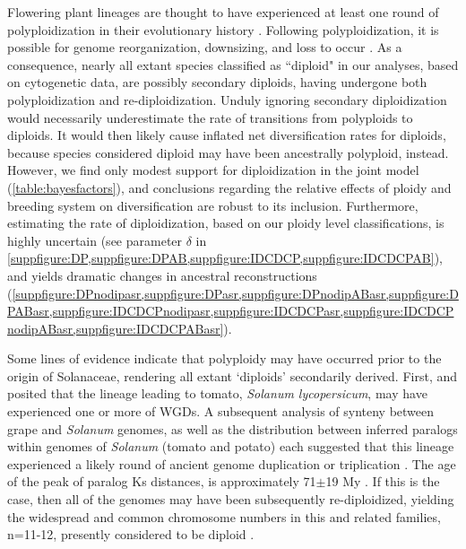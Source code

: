 Flowering plant lineages are thought to have experienced at least one round of polyploidization in their evolutionary history \citep{soltis_2015}. 
Following polyploidization, it is possible for genome reorganization, downsizing, and loss to occur \citep{dodsworth_2015, zenil_2016, mandakova_2018}. %
As a consequence, nearly all extant species classified as ``diploid" in our analyses, based on cytogenetic data, are possibly secondary diploids, having undergone both polyploidization and re-diploidization.
Unduly ignoring secondary diploidization would necessarily underestimate the rate of transitions from polyploids to diploids.
It would then likely cause inflated net diversification rates for diploids, because species considered diploid may have been ancestrally polyploid, instead. %
However, we find only modest support for diploidization in the joint model  (\cref{table:bayesfactors}), and conclusions regarding the relative effects of ploidy and breeding system on diversification are robust to its inclusion.
Furthermore, estimating the rate of diploidization, based on our ploidy level classifications, is highly uncertain (see parameter $\delta$ in \cref{suppfigure:DP,suppfigure:DPAB,suppfigure:IDCDCP,suppfigure:IDCDCPAB}), and yields dramatic changes in ancestral reconstructions (\cref{suppfigure:DPnodipasr,suppfigure:DPasr,suppfigure:DPnodipABasr,suppfigure:DPABasr,suppfigure:IDCDCPnodipasr,suppfigure:IDCDCPasr,suppfigure:IDCDCPnodipABasr,suppfigure:IDCDCPABasr}).


Some lines of evidence indicate that polyploidy may have occurred prior to the origin of Solanaceae, rendering all extant `diploids' secondarily derived. %
First, \citet{ku2000} and \citet{blanc2004} posited that the lineage leading to tomato, \textit{Solanum lycopersicum}, may have experienced one or more of WGDs.
A subsequent analysis of synteny between grape and \textit{Solanum} genomes, as well as the distribution between inferred paralogs within genomes of \textit{Solanum} (tomato and potato) each suggested that this lineage experienced a likely round of ancient genome duplication or triplication \citep{tomato2012}. 
The age of the peak of paralog Ks distances, is approximately 71$\pm$19 My \citep{tomato2012}. 
If this is the case, then all of the genomes may have been subsequently re-diploidized, yielding the widespread and common chromosome numbers in this and related families, n=11-12, presently considered to be diploid \citep{robertson_2011}. 

